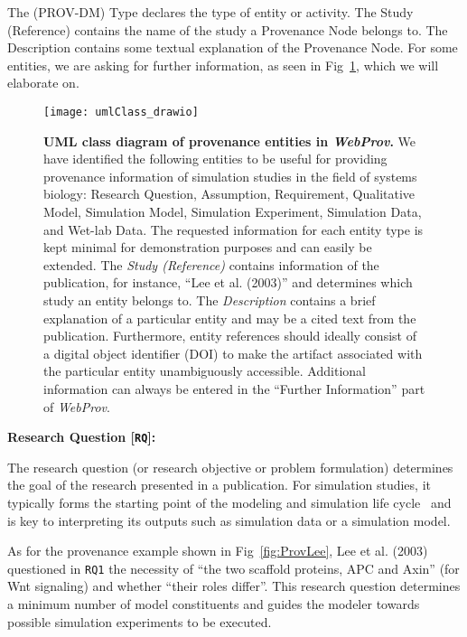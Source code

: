 \documentclass[10pt,letterpaper]{article}
\newcommand{\webprov}{\textit{WebProv}}
\newcommand{\wnt}{Wnt}
\newcommand{\provnode}{Provenance Node}
\newcommand{\lee}{Lee et al. (2003)}
\newcommand{\RQ}{Research Question}
\newcommand{\A}{Assumption}
\newcommand{\R}{Requirement}
\newcommand{\QM}{Qualitative Model}
\newcommand{\SM}{Simulation Model}
\newcommand{\SE}{Simulation Experiment}
\newcommand{\SD}{Simulation Data}
\newcommand{\WD}{Wet-lab Data}
\begin{document}
The (PROV-DM) Type declares the type of entity or activity.
The Study (Reference) contains the name of the study a \provnode{} belongs to.
The Description contains some textual explanation of the \provnode{}.
For some entities, we are asking for further information, as seen in Fig~\ref{fig:uml}, which we will elaborate on.


\begin{figure}[!h]
\begin{adjustwidth}{-2.25in}{0in}
\centering
\texttt{[image: umlClass\_drawio]}
\caption{{\bf UML class diagram of provenance entities in \webprov{}.}
We have identified the following entities to be useful for providing provenance information of simulation studies in the field of systems biology: \RQ{}, \A{}, \R{}, \QM{}, \SM{}, \SE{}, \SD{}, and \WD{}.
The requested information for each entity type is kept minimal for demonstration purposes and can easily be extended.
The \textit{Study (Reference)} contains information of the publication, for instance, \enquote{Lee et al. (2003)} and determines which study an entity belongs to.
The \textit{Description} contains a brief explanation of a particular entity and may be a cited text from the publication.
Furthermore, entity references should ideally consist of a digital object identifier (DOI) to make the artifact associated with the particular entity unambiguously accessible.
Additional information can always be entered in the \enquote{Further Information} part of \webprov{}.
}
\label{fig:uml}
\end{adjustwidth}
\end{figure}




\textbf{\RQ{} [\texttt{RQ}]:}

\noindent The research question (or research objective or problem formulation) determines the goal of the research presented in a publication.
For simulation studies, it typically forms the starting point of the modeling and simulation life cycle~\cite{Balci2012, Robinson2008} and is key to interpreting its outputs such as simulation data or a simulation model.

As for the provenance example shown in Fig~\ref{fig:ProvLee}, \lee{}~\cite{Lee2003} questioned in \texttt{RQ1} the necessity of \enquote{the two scaffold proteins, APC and Axin} (for \wnt{} signaling) and whether \enquote{their roles differ}.
This research question determines a minimum number of model constituents and guides the modeler towards possible simulation experiments to be executed.
\end{document}
